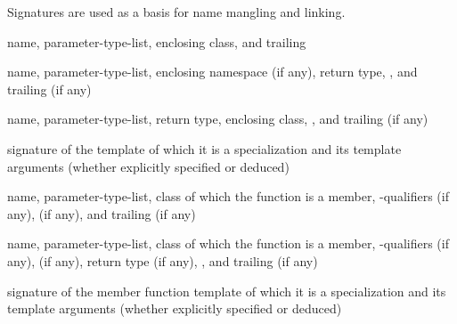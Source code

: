 \begin{defnote}
Signatures are used as a basis for
name mangling and linking.
\end{defnote}

%
name,
parameter-type-list,
enclosing class,
and
trailing 

%
name,
parameter-type-list,
enclosing namespace (if any),
return type,
,
and
trailing  (if any)

%
name,
parameter-type-list,
return type,
enclosing class,
,
and
trailing  (if any)

%
 signature of the template of which it is a specialization
and its template arguments (whether explicitly specified or deduced)

%
name,
parameter-type-list,
class of which the function is a member,
\cv-qualifiers (if any),
 (if any),
and
trailing  (if any)

%
name,
parameter-type-list,
class of which the function is a member,
\cv-qualifiers (if any),
 (if any),
return type (if any),
,
and
trailing  (if any)

%
 signature of the member function template
of which it is a specialization and its template arguments (whether explicitly specified or deduced)


